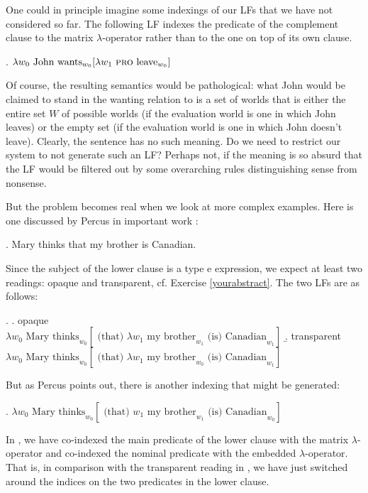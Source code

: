 One could in principle imagine some indexings of our LFs that we have not considered so far. The following LF indexes the predicate of the complement clause to the matrix $\lambda$-operator rather than to the one on top of its own clause.

\ex. $\lambda w_{0} \mbox{ John wants}_{w_{0}} [ \lambda w_{1} \mbox{ \textsc{pro} } \mbox{leave}_{w_{0}} ]$

Of course, the resulting semantics would be pathological: what John would be claimed to stand in the wanting relation to is a set of worlds that is either the entire set $W$ of possible worlds (if the evaluation world is one in which John leaves) or the empty set (if the evaluation world is one in which John doesn't leave). Clearly, the sentence has no such meaning. Do we need to restrict our system to not generate such an LF? Perhaps not, if the meaning is so absurd that the LF would be filtered out by some overarching rules distinguishing sense from nonsense.

But the problem becomes real when we look at more complex examples. Here is one discussed by Percus in important work \citep{percus:other00}:

\ex. Mary thinks that my brother is Canadian.

Since the subject of the lower clause is a type e expression, we expect at least two readings: opaque and transparent, cf. Exercise \ref{yourabstract}. The two LFs are as follows:

\ex. \a. opaque\\
$\lambda w_{0} \mbox{ Mary thinks}_{w_{0}} [ \mbox{ (that) } \lambda w_{1} \mbox{ my brother}_{w_{1}} \mbox{ (is) Canadian}_{w_{1}} ]$
\b. transparent\\
$\lambda w_{0} \mbox{ Mary thinks}_{w_{0}} [ \mbox{ (that) } \lambda w_{1} \mbox{ my brother}_{w_{0}} \mbox{ (is) Canadian}_{w_{1}} ]$

But as Percus points out, there is another indexing that might be generated:

\ex. $\lambda w_{0} \mbox{ Mary thinks}_{w_{0}} [ \mbox{ (that) } w_{1} \mbox{ my brother}_{w_{1}} \mbox{ (is) Canadian}_{w_{0}} ]$

In \Last, we have co-indexed the main predicate of the lower clause with the matrix $\lambda$-operator and co-indexed the nominal predicate  with the embedded $\lambda$-operator. That is, in comparison with the transparent reading in \LLast[b], we have just switched around the indices on the two predicates in the lower clause.

